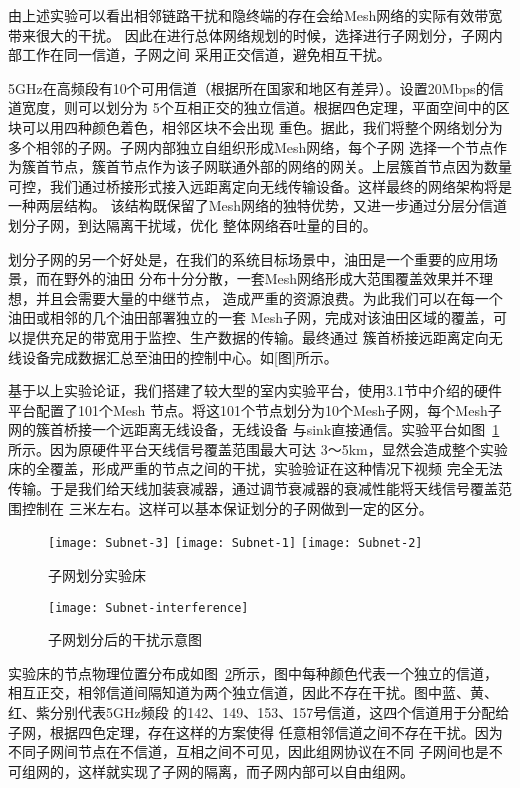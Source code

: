 由上述实验可以看出相邻链路干扰和隐终端的存在会给Mesh网络的实际有效带宽带来很大的干扰。
因此在进行总体网络规划的时候，选择进行子网划分，子网内部工作在同一信道，子网之间
采用正交信道，避免相互干扰。

5GHz在高频段有10个可用信道（根据所在国家和地区有差异）。设置20Mbps的信道宽度，则可以划分为
5个互相正交的独立信道。根据四色定理，平面空间中的区块可以用四种颜色着色，相邻区块不会出现
重色。据此，我们将整个网络划分为多个相邻的子网。子网内部独立自组织形成Mesh网络，每个子网
选择一个节点作为簇首节点，簇首节点作为该子网联通外部的网络的网关。上层簇首节点因为数量
可控，我们通过桥接形式接入远距离定向无线传输设备。这样最终的网络架构将是一种两层结构。
该结构既保留了Mesh网络的独特优势，又进一步通过分层分信道划分子网，到达隔离干扰域，优化
整体网络吞吐量的目的。

划分子网的另一个好处是，在我们的系统目标场景中，油田是一个重要的应用场景，而在野外的油田
分布十分分散，一套Mesh网络形成大范围覆盖效果并不理想，并且会需要大量的中继节点，
造成严重的资源浪费。为此我们可以在每一个油田或相邻的几个油田部署独立的一套
Mesh子网，完成对该油田区域的覆盖，可以提供充足的带宽用于监控、生产数据的传输。最终通过
簇首桥接远距离定向无线设备完成数据汇总至油田的控制中心。如[图]所示。

基于以上实验论证，我们搭建了较大型的室内实验平台，使用3.1节中介绍的硬件平台配置了101个Mesh
节点。将这101个节点划分为10个Mesh子网，每个Mesh子网的簇首桥接一个远距离无线设备，无线设备
与sink直接通信。实验平台如图~\ref{fig:subnet}所示。因为原硬件平台天线信号覆盖范围最大可达
3～5km，显然会造成整个实验床的全覆盖，形成严重的节点之间的干扰，实验验证在这种情况下视频
完全无法传输。于是我们给天线加装衰减器，通过调节衰减器的衰减性能将天线信号覆盖范围控制在
三米左右。这样可以基本保证划分的子网做到一定的区分。

\begin{figure}[h]
  \centering
  \subcaptionbox{}
      {\texttt{[image: Subnet-3]}}
  \hspace{1em}
  \subcaptionbox{}
    {\texttt{[image: Subnet-1]}}
  \hspace{1em}
  \subcaptionbox{}
    {\texttt{[image: Subnet-2]}}
  \caption{子网划分实验床}
  \label{fig:subnet}
\end{figure}

\begin{figure}[H] %
  \centering
  \texttt{[image: Subnet-interference]}
  \caption{子网划分后的干扰示意图}
  \label{fig:subnet_interference}
\end{figure}
实验床的节点物理位置分布成如图~\ref{fig:subnet_interference}所示，图中每种颜色代表一个独立的信道，
相互正交，相邻信道间隔知道为两个独立信道，因此不存在干扰。图中蓝、黄、红、紫分别代表5GHz频段
的142、149、153、157号信道，这四个信道用于分配给子网，根据四色定理，存在这样的方案使得
任意相邻信道之间不存在干扰。因为不同子网间节点在不信道，互相之间不可见，因此组网协议在不同
子网间也是不可组网的，这样就实现了子网的隔离，而子网内部可以自由组网。

